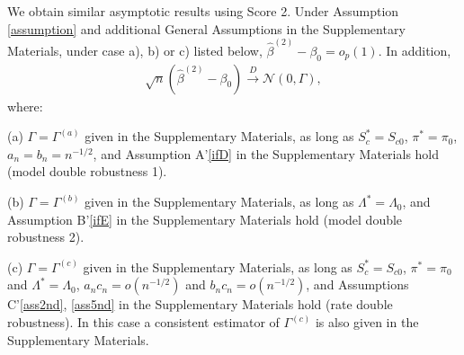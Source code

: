 \documentclass[11pt]{article}
\newcommand{\eqnn}{\begin{eqnarray*}}
\newcommand{\een}{\end{eqnarray*}}
\begin{document}
We obtain similar asymptotic results using Score 2.
Under Assumption \ref{assumption} and additional General Assumptions 
in the Supplementary Materials,  
under case a), b) or c) listed below, 
$\hat \beta^{(2)}-\beta_{0}=o_p(1)$.
In addition, 
\eqnn \sqrt{n}\left(\hat \beta^{(2)} - \beta_{0}\right)\overset{D}{\rightarrow}\mathcal{N}(0,\Gamma), 
\een
where:

(a)  
$\Gamma  = \Gamma^{(a)}$ given in the Supplementary Materials,  as long as 
$S^{*}_c =S_{c0} $, $\pi^{*} =\pi_0 $, 
$a_n=b_n=n^{-1/2}$,
and Assumption A'\ref{ifD} in the Supplementary Materials hold
(model double robustness 1).

(b) $\Gamma  = \Gamma^{(b)}$ given in the Supplementary Materials,  as long as 
 $\Lambda^{*} =\Lambda_0 $, 
and Assumption B'\ref{ifE} in the Supplementary Materials hold
 (model double robustness 2).

(c) $\Gamma  = \Gamma^{(c)}$ given in the Supplementary Materials,  as long as 
$S^{*}_c =S_{c0} $, $\pi^{*} =\pi_0 $ and $\Lambda^{*} =\Lambda_0 $, $a_n c_n=o(n^{-1/2})$ and $b_nc_n=o(n^{-1/2})$, and Assumptions C'\ref{ass2nd}, \ref{ass5nd}  in the Supplementary Materials hold (rate double robustness).
In this case a consistent estimator of $\Gamma^{(c)}$ is also given in the Supplementary Materials.
\end{document}
